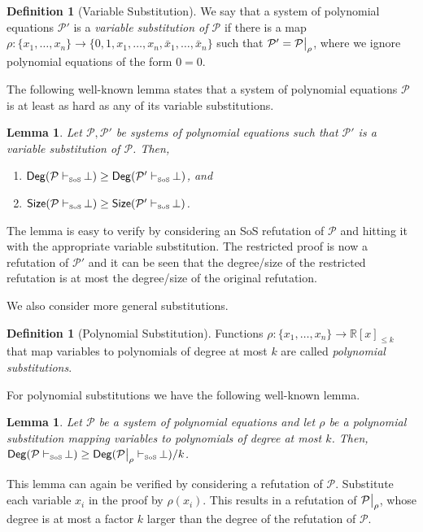 \documentclass[10pt,a4paper]{article}
\theoremstyle{plain}
\newtheorem{lemma}[theorem]{Lemma}
\theoremstyle{remark}
\theoremstyle{definition}
\newtheorem{definition}[theorem]{Definition}
\newcommand{\set}[1]{\{#1\}}
\newcommand\restrict[2]{{%
  \left.\kern-\nulldelimiterspace %
  #1 %
  \vphantom{\big|} %
  \right|_{#2} %
  }}
\newcommand{\calP}{\mathcal{P}}
\renewcommand{\R}{\mathbb{R}}
\DeclareMathOperator{\Deg}{\sf{Deg}}
\DeclareMathOperator{\Size}{\sf{Size}}
\newcommand{\RefuteDeg}[2]{\Deg(#2 \vdash_{\text{\tiny #1}} \, \perp)}
\newcommand{\RefuteSize}[2]{\Size(#2 \vdash_{\text{\tiny #1}} \, \perp)}
\newcommand{\subformula}{$ is a variable substitution of $}
\begin{document}
\begin{definition}[Variable Substitution]
  We say that a system of polynomial equations $\calP'$ is a
  \emph{variable substitution of $\calP$} if there is a map
  $\rho: \set{x_1, \ldots, x_n} \to \set{0,1, x_1, \ldots, x_n,
    \bar{x}_1, \ldots, \bar{x}_n}$ such that
  $\calP' = \restrict{\calP}{\rho}$, where we ignore polynomial
  equations of the form $0=0$.
\end{definition}

The following well-known lemma states that a system of polynomial
equations $\calP$ is at least as hard as any of its variable substitutions.
\begin{lemma}\label{lem:subformula}
  Let $\calP, \calP'$ be systems of polynomial equations such that
  $\calP' \subformula \calP$. Then,
  \begin{enumerate}[label=$(\roman*)$]
  \item $\RefuteDeg{SoS}{\calP} \ge \RefuteDeg{SoS}{\calP'}$, and
  \item $\RefuteSize{SoS}{\calP} \ge \RefuteSize{SoS}{\calP'}$.
  \end{enumerate}
\end{lemma}
The lemma is easy to verify by considering an SoS refutation of
$\calP$ and hitting it with the appropriate variable substitution. The
restricted proof is now a refutation of $\calP'$ and it can be seen
that the degree/size of the restricted refutation is at most the
degree/size of the original refutation.

We also consider more general substitutions.

\begin{definition}[Polynomial Substitution]
  Functions
  $\rho: \set{x_1, \ldots, x_n} \rightarrow \R[x]_{\le k}$ that map
  variables to polynomials of degree at most $k$ are called
  \emph{polynomial substitutions}.
\end{definition}

For polynomial substitutions we have the following well-known lemma.

\begin{lemma}
  \label{lem:sos degree polynomial substitution}
  Let $\calP$ be a system of polynomial equations and let $\rho$ be a
  polynomial substitution mapping variables to polynomials of degree
  at most $k$. Then,
  $\RefuteDeg{SoS}{\calP} \ge
  \RefuteDeg{SoS}{\restrict{\calP}{\rho}}/k$.
\end{lemma}

This lemma can again be verified by considering a refutation of
$\calP$. Substitute each variable $x_i$ in the proof by
$\rho(x_i)$. This results in a refutation of $\restrict{\calP}{\rho}$,
whose degree is at most a factor $k$ larger than the degree of the
refutation of $\calP$.
\end{document}
